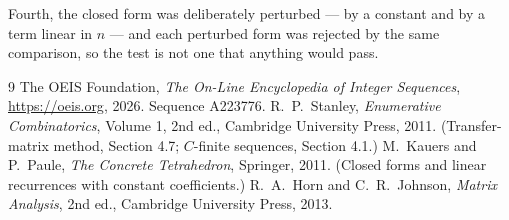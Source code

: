 \documentclass[11pt,a4paper]{article}
\theoremstyle{plain}
\theoremstyle{definition}
\begin{document}
Fourth, the closed form was deliberately perturbed --- by a constant and by a term linear in
$n$ --- and each perturbed form was rejected by the same comparison, so the test is not one
that anything would pass.

\begin{thebibliography}{9}
 The OEIS Foundation, \emph{The On-Line Encyclopedia of Integer
Sequences}, \url{https://oeis.org}, 2026. Sequence A223776.
 R.~P.~Stanley, \emph{Enumerative Combinatorics}, Volume 1, 2nd ed.,
Cambridge University Press, 2011. (Transfer-matrix method, Section 4.7; $C$-finite sequences,
Section 4.1.)
 M.~Kauers and P.~Paule, \emph{The Concrete Tetrahedron}, Springer, 2011.
(Closed forms and linear recurrences with constant coefficients.)
 R.~A.~Horn and C.~R.~Johnson, \emph{Matrix Analysis}, 2nd ed., Cambridge
University Press, 2013.
\end{thebibliography}
\end{document}

